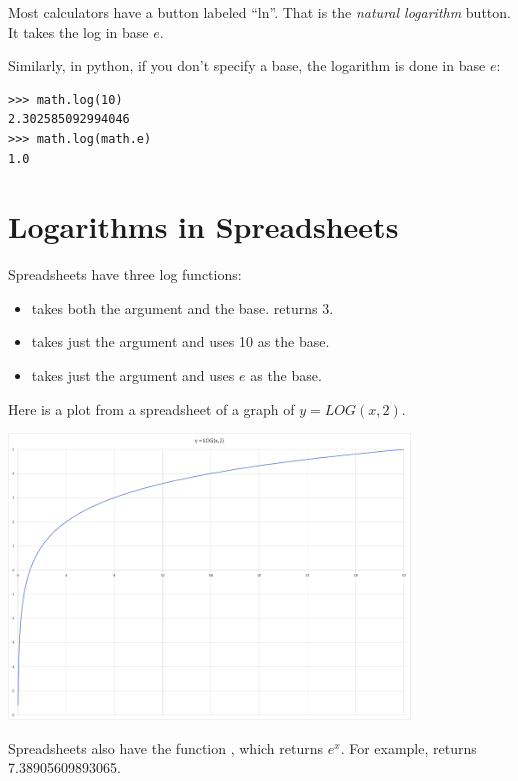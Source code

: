 Most calculators have a button labeled ``ln''. That is the
\textit{natural logarithm} button. It takes the log in base $e$.

Similarly, in python, if you don't specify a base, the logarithm is done in base $e$:

\begin{Verbatim}
>>> math.log(10)
2.302585092994046
>>> math.log(math.e)
1.0
\end{Verbatim}

\section{Logarithms in Spreadsheets}

Spreadsheets have three log functions:
\begin{itemize}
\item {} takes both the argument and the base.  returns 3.
\item {} takes just the argument and uses 10 as the base.
\item {} takes just the argument and uses $e$ as the base.
\end{itemize}

Here is a plot from a spreadsheet of a graph of $y = LOG(x, 2)$.

\includegraphics[width=0.8\textwidth]{log_graph.png}

Spreadsheets also have the function , which returns
$e^x$.  For example,  returns 7.38905609893065.

